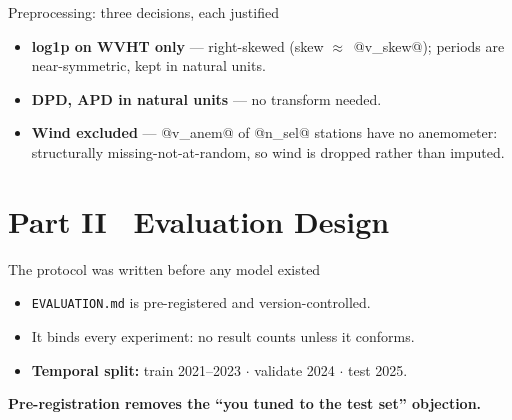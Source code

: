 \documentclass[aspectratio=169]{beamer}
\newcommand{\take}[1]{\vspace{0.6ex}\begin{center}\textbf{\color{colgraph}#1}\end{center}}
\begin{document}
\begin{frame}{Preprocessing: three decisions, each justified}
  \begin{itemize}
    \item \textbf{log1p on WVHT only} --- right-skewed (skew $\approx$~@v_skew@); periods are near-symmetric, kept in natural units.
    \item \textbf{DPD, APD in natural units} --- no transform needed.
    \item \textbf{Wind excluded} --- @v_anem@ of @n_sel@ stations have no anemometer: structurally missing-not-at-random, so wind is dropped rather than imputed.
  \end{itemize}
\end{frame}

\section{Part II \textperiodcentered\ Evaluation Design}

\begin{frame}{The protocol was written before any model existed}
  \begin{itemize}
    \item \texttt{EVALUATION.md} is pre-registered and version-controlled.
    \item It binds every experiment: no result counts unless it conforms.
    \item \textbf{Temporal split:} train 2021--2023 \;$\cdot$\; validate 2024 \;$\cdot$\; test 2025.
  \end{itemize}
  \take{Pre-registration removes the ``you tuned to the test set'' objection.}
\end{frame}
\end{document}
